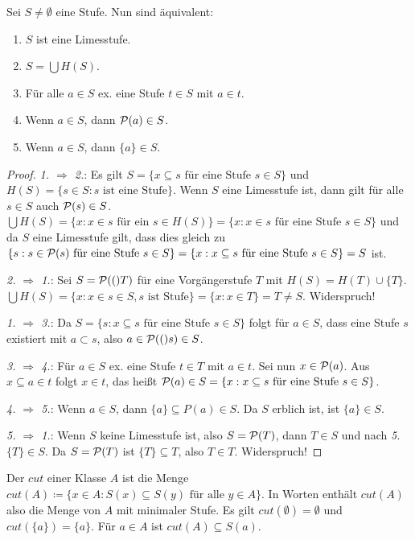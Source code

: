 \begin{satz}
	Sei $S\neq \emptyset$ eine Stufe. Nun sind äquivalent:
	\begin{enumerate}
		\item $S$ ist eine Limesstufe.
		\item $S=\bigcup H(S)$.
		\item Für alle $a\in S$ ex. eine Stufe $t\in S$ mit $a\in t$.
		\item Wenn $a\in S$, dann $\mathcal{P}(a)\in S$.
		\item Wenn $a\in S$, dann $\{a\}\in S$.
	\end{enumerate}
\end{satz}
\begin{proof}
	\textit{1. $\Rightarrow$ 2.}: Es gilt $S=\{x \subseteq s \text{ für eine Stufe } s\in S\}$ und $H(S)=\{s\in S : s\text{ ist eine Stufe}\}$. Wenn $S$ eine Limesstufe ist, dann gilt für alle $s\in S$ auch $\mathcal{P}(s)\in S$. $\bigcup H(S)=\{x : x\in s \text{ für ein } s \in H(S)\}=\{x : x\in s \text{ für eine Stufe } s\in S\}$ und da $S$ eine Limesstufe gilt, dass dies gleich zu $\{s : s \in \mathcal{P}(s) \text{ für eine Stufe } s \in S\}=\{x : x \subseteq s \text{ für eine Stufe } s\in S\}=S$ ist.
	
	\textit{2. $\Rightarrow$ 1.}: Sei $S=\mathcal{P}(()T)$ für eine Vorgängerstufe $T$ mit $H(S)=H(T)\cup \{T\}$. $\bigcup H(S)=\{x : x \in s \in S, s \text{ ist Stufe}\} = \{x : x \in T\}=T\neq S$. Widerspruch!
	
	\textit{1. $\Rightarrow$ 3.}: Da $S=\{s: x\subseteq s \text{ für eine Stufe } s \in S\}$ folgt für $a\in S$, dass eine Stufe $s$ existiert mit $a\subset s$, also $a\in \mathcal{P}(()s)\in S$.
	
	\textit{3. $\Rightarrow$ 4.}: Für $a\in S$ ex. eine Stufe $t\in T$ mit $a\in t$. Sei nun $x\in \mathcal{P}(a)$. Aus $x\subseteq a \in t$ folgt $x\in t$, das heißt $\mathcal{P}(a)\in S=\{x : x\subseteq s \text{ für eine Stufe } s\in S\}$.
	
	\textit{4. $\Rightarrow$ 5.}: Wenn $a\in S$, dann $\{a\}\subseteq P(a)\in S$. Da $S$ erblich ist, ist $\{a\}\in S$.
	
	\textit{5. $\Rightarrow$ 1.}: Wenn $S$ keine Limesstufe ist, also $S=\mathcal{P}(T)$, dann $T\in S$ und nach \textit{5.} $\{T\}\in S$. Da $S=\mathcal{P}(T)$ ist $\{T\}\subseteq T$, also $T\in T$. Widerspruch!
\end{proof}

\begin{definition}
	Der $cut$ einer Klasse $A$ ist die Menge $cut(A)\coloneqq\{x \in A : S(x)\subseteq S(y) \text{ für alle } y \in A\}$. In Worten enthält $cut(A)$ also die Menge von $A$ mit minimaler Stufe. Es gilt $cut(\emptyset)=\emptyset$ und $cut(\{a\})=\{a\}$. Für $a\in A$ ist $cut(A)\subseteq S(a)$.
\end{definition}

